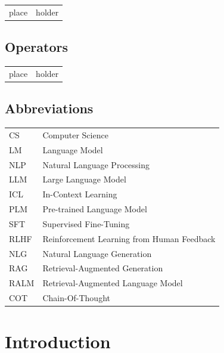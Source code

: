 \documentclass[english, 12pt, a4paper, sci, utf8, a-2b, online]{../definitions/aaltothesis}
\begin{document}
\begin{tabular}{ll}
place & holder \\
\end{tabular}

\subsection*{Operators}

\begin{tabular}{ll}
place & holder \\
\end{tabular}

\subsection*{Abbreviations}

\begin{tabular}{ll}
CS      & Computer Science \\
LM      & Language Model \\
NLP     & Natural Language Processing \\
LLM     & Large Language Model \\
ICL     & In-Context Learning \\
PLM     & Pre-trained Language Model \\
SFT     & Supervised Fine-Tuning \\
RLHF    & Reinforcement Learning from Human Feedback \\
NLG     & Natural Language Generation \\
RAG     & Retrieval-Augmented Generation \\
RALM    & Retrieval-Augmented Language Model \\
COT     & Chain-Of-Thought \\
\end{tabular}


\cleardoublepage

\section{Introduction}
\label{sec:intro}

\thispagestyle{empty}
\end{document}
